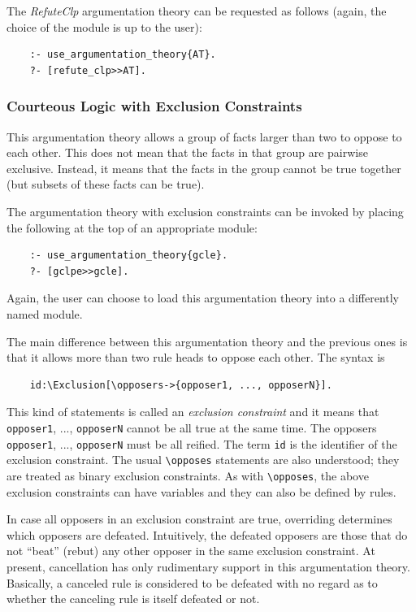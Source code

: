 \documentclass[11pt]{article}
\newcommand{\bs}{\textbackslash}
\begin{document}
The \emph{RefuteClp} argumentation theory can be requested as follows (again,
the choice of the module is up to the user):
\begin{verbatim}
    :- use_argumentation_theory{AT}.
    ?- [refute_clp>>AT].
\end{verbatim}

\subsubsection{Courteous Logic with Exclusion Constraints}

This argumentation theory
allows a group of facts larger than two to oppose to each other. This does
not mean that the facts in that group are pairwise exclusive. Instead, it
means that the facts in the group cannot be true together (but subsets of
these facts can be true).

The argumentation theory with exclusion constraints
can be invoked by placing the following at the
top of an appropriate module:
\begin{verbatim}
    :- use_argumentation_theory{gcle}.
    ?- [gclpe>>gcle].
\end{verbatim}
Again, the user can choose to load this argumentation theory into a
differently named module.

The main difference between this argumentation theory and the previous
ones is that it allows more than two rule heads to oppose each other.
The syntax is
\begin{verbatim}
    id:\Exclusion[\opposers->{opposer1, ..., opposerN}].
\end{verbatim}
This kind of statements is called an \emph{exclusion constraint} and it
means that {\tt opposer1}, ..., {\tt opposerN} cannot be all true    
at the same time. The opposers {\tt opposer1}, ..., {\tt opposerN} must be
all reified. The term {\tt id} is the identifier of the
exclusion constraint.
The usual {\tt \bs{}opposes} statements are also understood; they are
treated as binary exclusion constraints.
As with {\tt \bs{}opposes}, the above exclusion constraints can have variables
and they can also be defined by rules.

In case all opposers in an exclusion constraint are true, overriding
determines which opposers are defeated.  Intuitively, the defeated opposers
are those that do not ``beat'' (rebut) any other opposer in the same
exclusion constraint.  At present, cancellation has only rudimentary
support in this argumentation theory.  Basically, a canceled rule is
considered to be defeated with no regard as to whether the canceling rule
is itself defeated or not.
\end{document}
